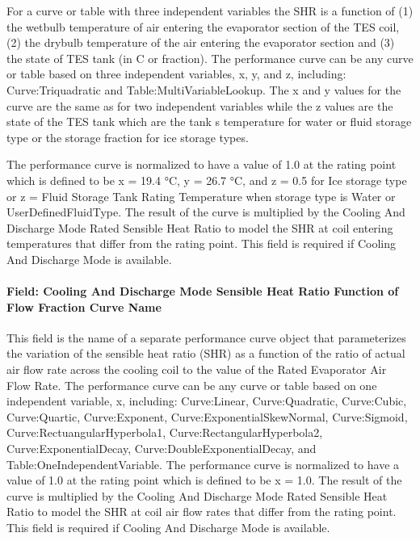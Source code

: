 For a curve or table with three independent variables the SHR is a function of (1) the wetbulb temperature of air entering the evaporator section of the TES coil, (2) the drybulb temperature of the air entering the evaporator section and (3) the state of TES tank (in C or fraction). The performance curve can be any curve or table based on three independent variables, x, y, and z, including: Curve:Triquadratic and Table:MultiVariableLookup. The x and y values for the curve are the same as for two independent variables while the z values are the state of the TES tank which are the tank s temperature for water or fluid storage type or the storage fraction for ice storage types.

The performance curve is normalized to have a value of 1.0 at the rating point which is defined to be x = 19.4 °C, y = 26.7 °C, and z = 0.5 for Ice storage type or z = Fluid Storage Tank Rating Temperature when storage type is Water or UserDefinedFluidType. The result of the curve is multiplied by the Cooling And Discharge Mode Rated Sensible Heat Ratio to model the SHR at coil entering temperatures that differ from the rating point. This field is required if Cooling And Discharge Mode is available.

\paragraph{Field: Cooling And Discharge Mode Sensible Heat Ratio Function of Flow Fraction Curve Name}\label{field-cooling-and-discharge-mode-sensible-heat-ratio-function-of-flow-fraction-curve-name}

This field is the name of a separate performance curve object that parameterizes the variation of the sensible heat ratio (SHR) as a function of the ratio of actual air flow rate across the cooling coil to the value of the Rated Evaporator Air Flow Rate. The performance curve can be any curve or table based on one independent variable, x, including: Curve:Linear, Curve:Quadratic, Curve:Cubic, Curve:Quartic, Curve:Exponent, Curve:ExponentialSkewNormal, Curve:Sigmoid, Curve:RectuangularHyperbola1, Curve:RectangularHyperbola2, Curve:ExponentialDecay, Curve:DoubleExponentialDecay, and Table:OneIndependentVariable. The performance curve is normalized to have a value of 1.0 at the rating point which is defined to be x = 1.0. The result of the curve is multiplied by the Cooling And Discharge Mode Rated Sensible Heat Ratio to model the SHR at coil air flow rates that differ from the rating point. This field is required if Cooling And Discharge Mode is available.

